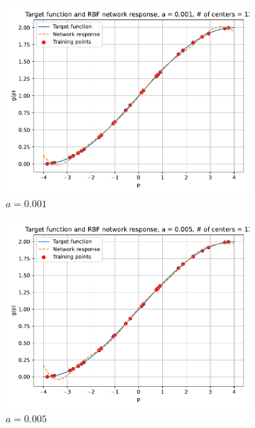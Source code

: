 \begin{figure}[htbp]
	\centering
	\begin{subfigure}{0.33\linewidth}
		\centering
		\includegraphics[width=\linewidth]{../Problem 2/prob2_response_a_0.001_Cnum_12.pdf}
		\caption{$a=0.001$}
	\end{subfigure}\hfill
	\begin{subfigure}{0.33\linewidth}
		\centering
		\includegraphics[width=\linewidth]{../Problem 2/prob2_response_a_0.005_Cnum_12.pdf}
		\caption{$a=0.005$}
	\end{subfigure}\hfill
	\begin{subfigure}{0.33\linewidth}
		\centering

\end{subfigure}
\end{figure}

